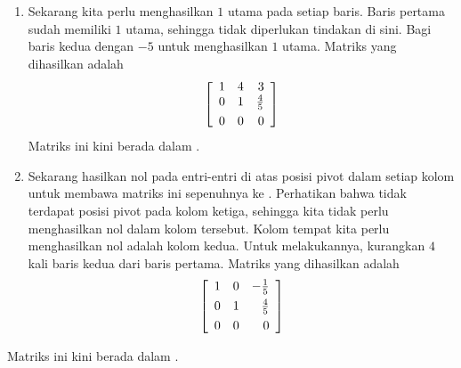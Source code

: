 \begin{solution}
\begin{enumerate}
\item Sekarang kita perlu menghasilkan $1$ utama pada setiap baris. Baris pertama sudah memiliki $1$ utama, sehingga tidak diperlukan tindakan di sini.
Bagi baris kedua dengan $-5$ untuk menghasilkan $1$ utama. Matriks yang dihasilkan adalah
\begin{equation*}
\leftB
\begin{array}{rrr}
1 & 4 & 3 \\
0 & 1 & \vspace{0.05in}\frac{4}{5} \\
0 & 0 & 0
\end{array}
\rightB
\end{equation*}
Matriks ini kini berada dalam \ef.

\item Sekarang hasilkan nol pada entri-entri di atas posisi pivot dalam setiap kolom untuk membawa matriks ini sepenuhnya ke \rref.
Perhatikan bahwa tidak terdapat posisi pivot pada kolom ketiga, sehingga kita tidak perlu menghasilkan nol dalam kolom tersebut. Kolom tempat kita
perlu menghasilkan nol adalah kolom kedua. Untuk melakukannya, kurangkan $4$ kali baris kedua dari baris pertama. Matriks yang dihasilkan adalah
\begin{equation*}
\leftB
\begin{array}{rrr}
1 & 0 & -\vspace{0.05in}\frac{1}{5} \\
0 & 1 & \vspace{0.05in}\frac{4}{5} \\
0 & 0 & 0
\end{array}
\rightB
\end{equation*}
\end{enumerate}
Matriks ini kini berada dalam \rref.
\end{solution}

